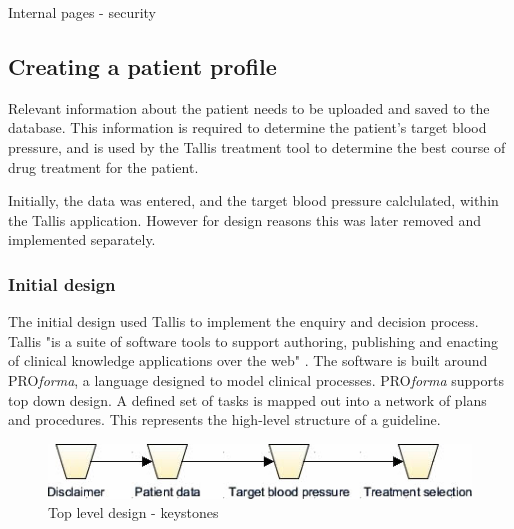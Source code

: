 \documentclass[11pt]{article}
\begin{document}
\begin{code}[ht]
\caption{Internal pages - security}
\label{code:intPages}
\end{code}


\subsection{Creating a patient profile}

Relevant information about the patient needs to be uploaded and saved to the database. This information is required to determine the patient's target blood pressure, and is used by the Tallis treatment tool to determine the best course of drug treatment for the patient.

Initially, the data was entered, and the target blood pressure calclulated, within the Tallis application. However for design reasons this was later removed and implemented separately.

\subsubsection{Initial design}

The initial design used Tallis to implement the enquiry and decision process. Tallis "is a suite of software tools to support authoring, publishing and enacting of clinical knowledge applications over the web" \cite{tallisDescription}. The software is built around PRO\textit{forma}, a language designed to model clinical processes. PRO\textit{forma} supports top down design. A defined set of tasks is mapped out into a network of plans and procedures. This represents the high-level structure of a guideline. 

\begin{figure}[ht]
\begin{center}
\includegraphics[scale=0.8]{tallis_keystone_top}
\caption{Top level design - keystones}
\label{fig:tallis_keystone_top}
\end{center}
\end{figure}
\end{document}
